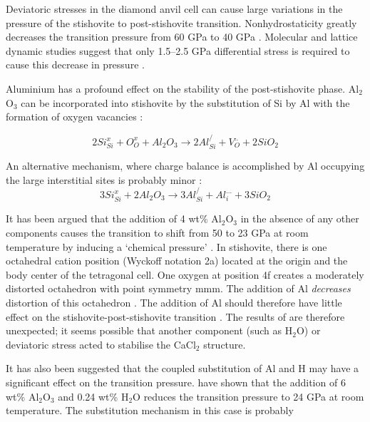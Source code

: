 \documentclass[review]{elsarticle}
\begin{document}
Deviatoric stresses in the diamond anvil cell can cause large variations in the pressure of the stishovite to post-stishovite transition. Nonhydrostaticity greatly decreases the transition pressure from 60 GPa \citep{AAML2003, HSCHMK2000} to 40 GPa \citep{KMH1996, SAB2012}. Molecular and lattice dynamic studies suggest that only 1.5--2.5 GPa differential stress is required to cause this decrease in pressure \citep{DB1996}.

Aluminium has a profound effect on the stability of the post-stishovite phase. Al$_2$O$_3$ can be incorporated into stishovite by the substitution of Si by Al with the formation of oxygen vacancies \citep{SSP1995,HTSO2005,BBB2006,LLSHLOB2007}:

\begin{equation}
2Si^x_{Si} + O^x_O + Al_2O_3 \rightarrow 2Al^/_{Si} + V^{..}_O + 2SiO_2
\end{equation}

An alternative mechanism, where charge balance is accomplished by Al occupying the large interstitial sites is probably minor \cite{SSP1995}:
\begin{equation}
3Si^x_{Si} + 2Al_2O_3 \rightarrow 3Al^/_{Si} + Al^{...}_i + 3SiO_2
\end{equation}

It has been argued that the addition of 4 wt\% Al$_2$O$_3$ in the absence of any other components causes the transition to shift from 50 to 23 GPa at room temperature by inducing a `chemical pressure' \citep{BAAG2009}. In stishovite, there is one octahedral cation position (Wyckoff notation 2a) located at the origin and the body center of the tetragonal cell. One oxygen at position 4f creates a moderately distorted octahedron with point symmetry mmm. The addition of Al \emph{decreases} distortion of this octahedron \citep{SSP1995}. The addition of Al should therefore have little effect on the stishovite-post-stishovite transition \citep{Panero2006}. The results of \cite{BAAG2009} are therefore unexpected; it seems possible that another component (such as H$_2$O) or deviatoric stress acted to stabilise the CaCl$_2$ structure.

It has also been suggested that the coupled substitution of Al and H may have a significant effect on the transition pressure. \cite{Lakshtanovetal2007} have shown that the addition of 6 wt\% Al$_2$O$_3$ and 0.24 wt\% H$_2$O reduces the transition pressure to 24 GPa at room temperature. The substitution mechanism in this case is probably
\end{document}
